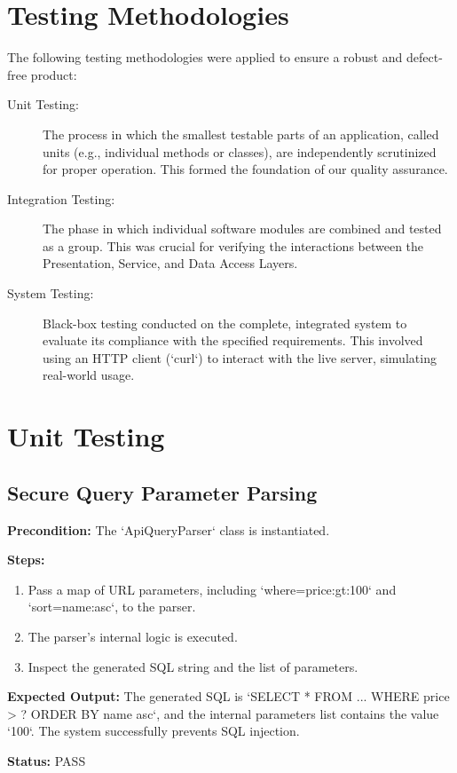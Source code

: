 \documentclass[12pt, a4paper]{report}
\begin{document}
\section{Testing Methodologies}
The following testing methodologies were applied to ensure a robust and defect-free product:
\begin{description}
    \item[Unit Testing:] The process in which the smallest testable parts of an application, called units (e.g., individual methods or classes), are independently scrutinized for proper operation. This formed the foundation of our quality assurance.
    \item[Integration Testing:] The phase in which individual software modules are combined and tested as a group. This was crucial for verifying the interactions between the Presentation, Service, and Data Access Layers.
    \item[System Testing:] Black-box testing conducted on the complete, integrated system to evaluate its compliance with the specified requirements. This involved using an HTTP client (`curl`) to interact with the live server, simulating real-world usage.
\end{description}

\section{Unit Testing}
\subsection{Secure Query Parameter Parsing}
\textbf{Precondition:} The `ApiQueryParser` class is instantiated.

\textbf{Steps:}
\begin{enumerate}
    \item Pass a map of URL parameters, including `where=price:gt:100` and `sort=name:asc`, to the parser.
    \item The parser's internal logic is executed.
    \item Inspect the generated SQL string and the list of parameters.
\end{enumerate}

\textbf{Expected Output:} The generated SQL is `SELECT * FROM ... WHERE price > ? ORDER BY name asc`, and the internal parameters list contains the value `100`. The system successfully prevents SQL injection.

\textbf{Status:} PASS
\end{document}
